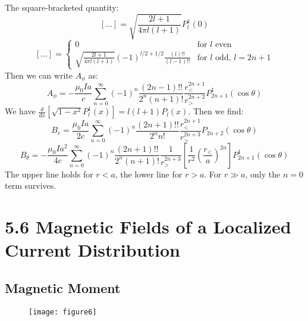 \documentclass{article}
\begin{document}
	The square-bracketed quantity:
	\[
	[\dots] = \sqrt{\frac{2l+1}{4\pi l(l+1)}} P_l^1(0)
	\]
	\[
	[\dots] =
	\begin{cases}
		0 & \text{for } l \text{ even} \\
		\sqrt{\frac{2l+1}{4\pi l(l+1)}} (-1)^{l/2+1/2} \frac{(l)!!}{(l-1)!!} & \text{for } l \text{ odd, } l=2n+1
	\end{cases}
	\]
	Then we can write $A_\phi$ as:
	\[
	A_\phi = -\frac{\mu_0 I a}{c} \sum_{n=0}^{\infty} (-1)^n \frac{(2n-1)!!}{2^n (n+1)!} \frac{r_<^ {2n+1}}{r_>^{2n+2}} P_{2n+1}^1(\cos\theta)
	\]
	We have $\frac{d}{dx}[\sqrt{1-x^2} P_l^1(x)] = l(l+1)P_l(x)$. Then we find:
	\[
	B_r = \frac{\mu_0 I a}{2c} \sum_{n=0}^\infty (-1)^n \frac{(2n+1)!!}{2^n n!} \frac{r_<^{2n+1}}{r_>^{2n+3}} P_{2n+2}(\cos\theta)
	\]
	\[
	B_\theta = -\frac{\mu_0 I a^2}{4c} \sum_{n=0}^\infty (-1)^n \frac{(2n+1)!!}{2^n(n+1)!} \frac{1}{r_>^{2n+3}} \left[ \frac{1}{r^2} (\frac{r_<}{a})^{2n} \right] P_{2n+1}^1(\cos\theta)
	\]
	The upper line holds for $r<a$, the lower line for $r>a$.
	For $r \gg a$, only the $n=0$ term survives.
	
	\section*{5.6 Magnetic Fields of a Localized Current Distribution}
	
	\subsection*{Magnetic Moment}
	\begin{figure}[h]
		\centering
		\texttt{[image: figure6]}
		\caption{}
		\label{fig:figure6}
	\end{figure}
	
\end{document}
